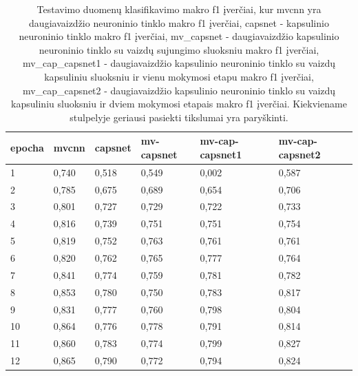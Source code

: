 \begin{table}[]
	\caption{
		Testavimo duomenų klasifikavimo makro f1 įverčiai, kur mvcnn yra daugiavaizdžio neuroninio tinklo makro f1 įverčiai, capsnet - kapsulinio neuroninio tinklo makro f1 įverčiai, mv\_capsnet - daugiavaizdžio kapsulinio neuroninio tinklo su vaizdų sujungimo sluoksniu makro f1 įverčiai, mv\_cap\_capsnet1 - daugiavaizdžio kapsulinio neuroninio tinklo su vaizdų kapsuliniu sluoksniu ir vienu mokymosi etapu makro f1 įverčiai, mv\_cap\_capsnet2 - daugiavaizdžio kapsulinio neuroninio tinklo su vaizdų kapsuliniu sluoksniu ir dviem mokymosi etapais makro f1 įverčiai. Kiekviename stulpelyje geriausi pasiekti tikslumai yra paryškinti.
	}
	\begin{tabular}{l|l|l|l|l|l}
		epocha & mvcnn & capsnet & mv-capsnet & mv-cap-capsnet1 & mv-cap-capsnet2 \\
		\hline
		1 & 0,740 &   0,518 &      0,549 &           0,002 &           0,587 \\
		2 & 0,785 &   0,675 &      0,689 &           0,654 &           0,706 \\
		3 & 0,801 &   0,727 &      0,729 &           0,722 &           0,733 \\
		4 & 0,816 &   0,739 &      0,751 &           0,751 &           0,754 \\
		5 & 0,819 &   0,752 &      0,763 &           0,761 &           0,761 \\
		6 & 0,820 &   0,762 &      0,765 &           0,777 &           0,764 \\
		7 & 0,841 &   0,774 &      0,759 &           0,781 &           0,782 \\
		8 & 0,853 &   0,780 &      0,750 &           0,783 &           0,817 \\
		9 & 0,831 &   0,777 &      0,760 &           0,798 &           0,804 \\
		10 & 0,864 &   0,776 &      0,778 &           0,791 &           0,814 \\
		11 & 0,860 &   0,783 &      0,774 &           0,799 &           0,827 \\
		12 & 0,865 &   0,790 &      0,772 &           0,794 &           0,824 \\
	\end{tabular}
	\label{tbl:macro_f1}
\end{table}


